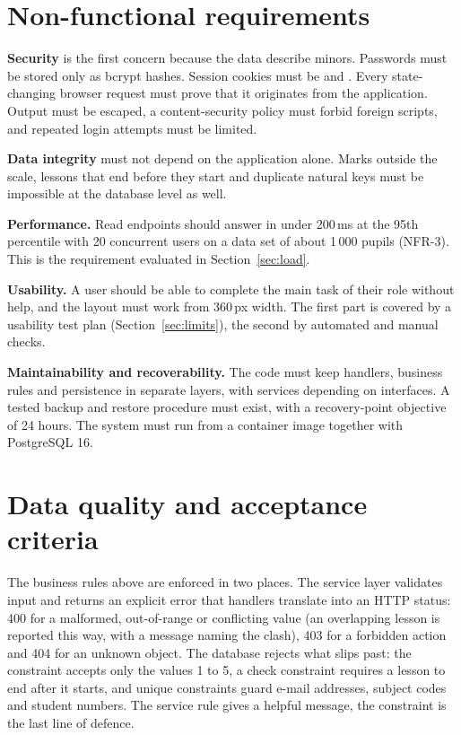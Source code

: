 \section{Non-functional requirements}

\textbf{Security} is the first concern because the data describe minors. Passwords must be stored only as bcrypt hashes. Session cookies must be  and . Every state-changing browser request must prove that it originates from the application. Output must be escaped, a content-security policy must forbid foreign scripts, and repeated login attempts must be limited.

\textbf{Data integrity} must not depend on the application alone. Marks outside the scale, lessons that end before they start and duplicate natural keys must be impossible at the database level as well.

\textbf{Performance.} Read endpoints should answer in under 200\,ms at the 95th percentile with 20 concurrent users on a data set of about 1\,000 pupils (NFR-3). This is the requirement evaluated in Section~\ref{sec:load}.

\textbf{Usability.} A user should be able to complete the main task of their role without help, and the layout must work from 360\,px width. The first part is covered by a usability test plan (Section~\ref{sec:limits}), the second by automated and manual checks.

\textbf{Maintainability and recoverability.} The code must keep handlers, business rules and persistence in separate layers, with services depending on interfaces. A tested backup and restore procedure must exist, with a recovery-point objective of 24 hours. The system must run from a container image together with PostgreSQL 16.

\section{Data quality and acceptance criteria}

The business rules above are enforced in two places. The service layer validates input and returns an explicit error that handlers translate into an HTTP status: 400 for a malformed, out-of-range or conflicting value (an overlapping lesson is reported this way, with a message naming the clash), 403 for a forbidden action and 404 for an unknown object. The database rejects what slips past: the  constraint accepts only the values 1 to 5, a check constraint requires a lesson to end after it starts, and unique constraints guard e-mail addresses, subject codes and student numbers. The service rule gives a helpful message, the constraint is the last line of defence.

